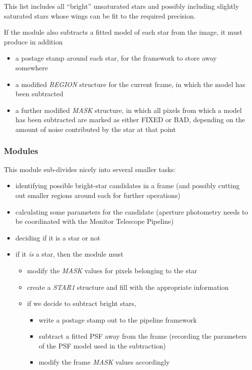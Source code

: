 This list includes all ``bright'' unsaturated stars
and possibly including slightly saturated stars whose 
wings can be fit to the required precision.

  If the module also subtracts a fitted model of each star from 
the image, it must produce in addition

\begin{itemize}
  \item a postage stamp around each star, for the framework to
        store away somewhere
  \item a modified {\it REGION} structure for the current frame,
        in which the model has been subtracted
  \item a further modified {\it MASK} structure, in which
        all pixels from which a model has been subtracted are
        marked as either FIXED or BAD, depending on the 
        amount of noise contributed by the star at that point
\end{itemize}

\subsubsection {Modules}

  This module sub-divides nicely into several smaller tasks:

\begin{itemize}
  \item identifying possible bright-star candidates in a frame (and 
        possibly cutting out smaller regions around each for further
        operations)
  \item calculating some parameters for the candidate (aperture
        photometry needs to be coordinated with the Monitor Telescope Pipeline)
  \item deciding if it is a star or not
  \item if it {\it is} a star, then the module must
  \begin{itemize}
    \item modify the {\it MASK} values for pixels belonging to the star
    \item create a {\it STAR1} structure and fill with the
          appropriate information
    \item if we decide to subtract bright stars,
    \begin{itemize}
      \item write a postage stamp out to the pipeline framework
      \item subtract a fitted PSF away from the frame (recording the
            parameters of the PSF model used in the subtraction)
      \item modify the frame {\it MASK} values accordingly
    \end{itemize}
  \end{itemize}
\end{itemize}

